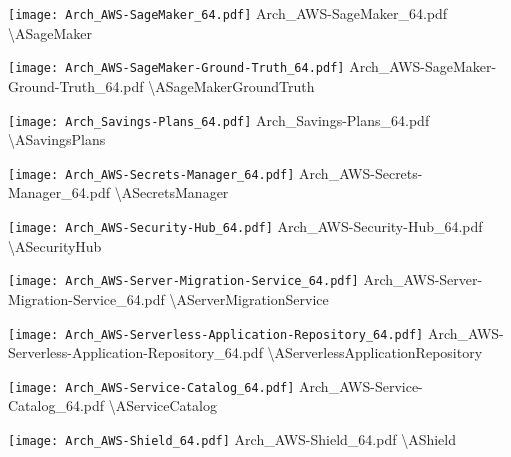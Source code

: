  {\texttt{[image: Arch\_AWS-SageMaker\_64.pdf]}} {Arch\_AWS-SageMaker\_64.pdf} {{\textbackslash}ASageMaker}

 {\texttt{[image: Arch\_AWS-SageMaker-Ground-Truth\_64.pdf]}} {Arch\_AWS-SageMaker-Ground-Truth\_64.pdf} {{\textbackslash}ASageMakerGroundTruth}

 {\texttt{[image: Arch\_Savings-Plans\_64.pdf]}} {Arch\_Savings-Plans\_64.pdf} {{\textbackslash}ASavingsPlans}

 {\texttt{[image: Arch\_AWS-Secrets-Manager\_64.pdf]}} {Arch\_AWS-Secrets-Manager\_64.pdf} {{\textbackslash}ASecretsManager}

 {\texttt{[image: Arch\_AWS-Security-Hub\_64.pdf]}} {Arch\_AWS-Security-Hub\_64.pdf} {{\textbackslash}ASecurityHub}

 {\texttt{[image: Arch\_AWS-Server-Migration-Service\_64.pdf]}} {Arch\_AWS-Server-Migration-Service\_64.pdf} {{\textbackslash}AServerMigrationService}

 {\texttt{[image: Arch\_AWS-Serverless-Application-Repository\_64.pdf]}} {Arch\_AWS-Serverless-Application-Repository\_64.pdf} {{\textbackslash}AServerlessApplicationRepository}

 {\texttt{[image: Arch\_AWS-Service-Catalog\_64.pdf]}} {Arch\_AWS-Service-Catalog\_64.pdf} {{\textbackslash}AServiceCatalog}

 {\texttt{[image: Arch\_AWS-Shield\_64.pdf]}} {Arch\_AWS-Shield\_64.pdf} {{\textbackslash}AShield}

